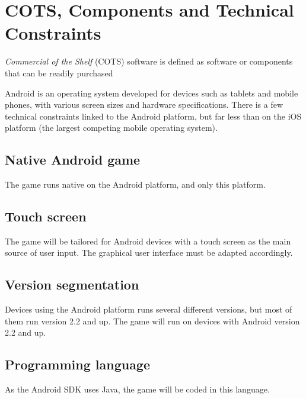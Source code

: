\chapter{COTS, Components and Technical Constraints}
\emph{Commercial of the Shelf} (COTS) software is defined as software or components that can be readily purchased\cite{pensum}

Android is an operating system developed for devices such as tablets and mobile phones, with various screen sizes and hardware specifications. There is a few technical constraints linked to the Android platform, but far less than on the iOS platform (the largest competing mobile operating system). 

\section{Native Android game}
The game runs native on the Android platform, and only this platform.

\section{Touch screen}
The game will be tailored for Android devices with a touch screen as the main source of user input. The graphical user interface must be adapted accordingly. 

\section{Version segmentation}
Devices using the Android platform runs several different versions, but most of them run version 2.2 and up.\cite{androidversions} The game will run on devices with Android version 2.2 and up.

\section{Programming language}
As the Android SDK\cite{androidsdk} uses Java, the game will be coded in this language.